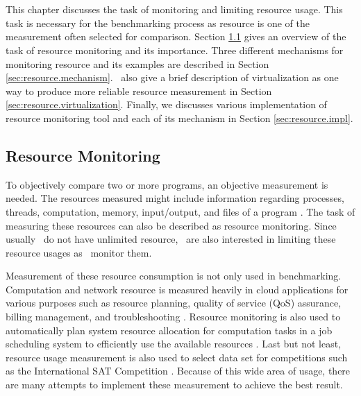\chapter{\chResource}
\label{ch:resource}

This chapter discusses the task of monitoring and limiting resource usage.
This task is necessary for the benchmarking process as resource is one of the measurement often selected for comparison.
Section \ref{sec:resource.overview} gives an overview of the task of resource monitoring and its importance.
Three different mechanisms for monitoring resource and its examples are described in Section \ref{sec:resource.mechanism}.
\First~also give a brief description of virtualization as one way to produce more reliable resource measurement in Section \ref{sec:resource.virtualization}.
Finally, we discusses various implementation of resource monitoring tool and each of its mechanism in Section \ref{sec:resource.impl}.

\section{Resource Monitoring}
\label{sec:resource.overview}

To objectively compare two or more programs, an objective measurement is needed.
The resources measured might include information regarding processes, threads, computation, memory, input/output, and files of a program \citep{juvePracticalResourceMonitoring2015}.
The task of measuring these resources can also be described as resource monitoring.
Since usually \first~do not have unlimited resource, \first~are also interested in limiting these resource usages as \first~monitor them.

Measurement of these resource consumption is not only used in benchmarking.
Computation and network resource is measured heavily in cloud applications for various purposes such as resource planning, quality of service (QoS) assurance, billing management, and troubleshooting \citep{aceto2013cloud}.
Resource monitoring is also used to automatically plan system resource allocation for computation tasks in a job scheduling system to efficiently use the available resources \citep{tovarJobSizingStrategy2018}.
Last but not least, resource usage measurement is also used to select data set for competitions such as the International SAT Competition \citep{heule2018proceedings}.
Because of this wide area of usage, there are many attempts to implement these measurement to achieve the best result.

